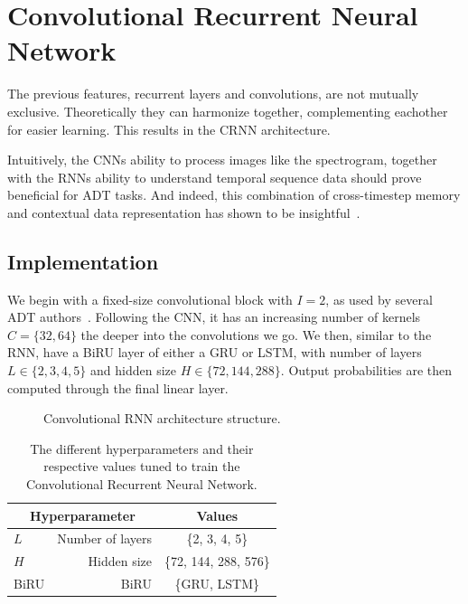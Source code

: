 \section[Convolutional RNN]{Convolutional Recurrent Neural Network}

The previous features, recurrent layers and convolutions, are not mutually exclusive. Theoretically they can harmonize together, complementing eachother for easier learning. This results in the \gls{CRNN} architecture.

Intuitively, the \glspl{CNN} ability to process images like the spectrogram, together with the \glspl{RNN} ability to understand temporal sequence data should prove beneficial for \gls{ADT} tasks. And indeed, this combination of cross-timestep memory and contextual data representation has shown to be insightful~\cite{Vogl2017DrumTV, vogl2018multiinstrumentdrumtranscription, signals4040042}.

\subsection{Implementation}

We begin with a fixed-size convolutional block with $I = 2$, as used by several \gls{ADT} authors~\cite{Vogl2017DrumTV, signals4040042}. Following the \gls{CNN}, it has an increasing number of kernels $C = \{32, 64\}$ the deeper into the convolutions we go. We then, similar to the \gls{RNN}, have a \gls{BiRU} layer of either a \gls{GRU} or \gls{LSTM}, with number of layers $L \in \{2, 3, 4, 5\}$ and hidden size $H \in \{72, 144, 288\}$. Output probabilities are then computed through the final linear layer.

\begin{figure}[H]
    \centering
    
    \caption{Convolutional RNN architecture structure.}
    \label{CRNNFigure}
\end{figure}

\begin{table}[H]
    \centering
    \begin{tabular}{lr|c}
        \multicolumn{2}{c|}{Hyperparameter} & Values       \\
        \hline
        $L$ & Number of layers      & \{2, 3, 4, 5\} \\
        $H$ & Hidden size      & \{72, 144, 288, 576\} \\
        \gls{BiRU} & \acrlong{BiRU} & \{\gls{GRU}, \gls{LSTM}\}\\
    \end{tabular}
    \caption{The different hyperparameters and their respective values tuned to train the Convolutional Recurrent Neural Network.}
    \label{CRNNHyperparams}
\end{table}

